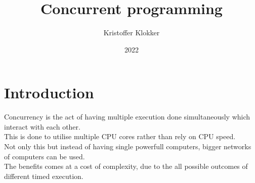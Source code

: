 \documentclass[12pt, a4paper]{article}
\title{Concurrent programming}
\date{2022}
\author{Kristoffer Klokker}
\begin{document}
	\maketitle
	\clearpage
	\tableofcontents
	\clearpage
	\section{Introduction}
		Concurrency is the act of having multiple execution done simultaneously which interact with each other.\\
		This is done to utilise multiple CPU cores rather than rely on CPU speed.\\
		Not only this but instead of having single powerfull computers, bigger networks of computers can be used.\\
		The benefits comes at a cost of complexity, due to the all possible outcomes of different timed execution.
\end{document}
